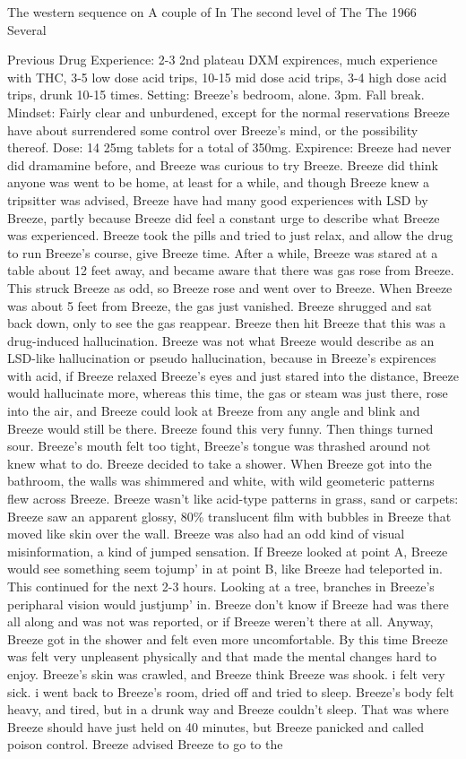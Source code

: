 \documentclass[12pt]{book}
\begin{document}
The western sequence on A couple of In The second level of The The 1966 Several



Previous Drug Experience: 2-3 2nd plateau DXM expirences, much experience with THC, 3-5 low dose acid trips, 10-15 mid dose acid trips, 3-4 high dose acid trips, drunk 10-15 times. Setting: Breeze's bedroom, alone. 3pm. Fall break. Mindset: Fairly clear and unburdened, except for the normal reservations Breeze have about surrendered some control over Breeze's mind, or the possibility thereof. Dose: 14 25mg tablets for a total of 350mg. Expirence: Breeze had never did dramamine before, and Breeze was curious to try Breeze. Breeze did think anyone was went to be home, at least for a while, and though Breeze knew a tripsitter was advised, Breeze have had many good experiences with LSD by Breeze, partly because Breeze did feel a constant urge to describe what Breeze was experienced. Breeze took the pills and tried to just relax, and allow the drug to run Breeze's course, give Breeze time. After a while, Breeze was stared at a table about 12 feet away, and became aware that there was gas rose from Breeze. This struck Breeze as odd, so Breeze rose and went over to Breeze. When Breeze was about 5 feet from Breeze, the gas just vanished. Breeze shrugged and sat back down, only to see the gas reappear. Breeze then hit Breeze that this was a drug-induced hallucination. Breeze was not what Breeze would describe as an LSD-like hallucination or pseudo hallucination, because in Breeze's expirences with acid, if Breeze relaxed Breeze's eyes and just stared into the distance, Breeze would hallucinate more, whereas this time, the gas or steam was just there, rose into the air, and Breeze could look at Breeze from any angle and blink and Breeze would still be there. Breeze found this very funny. Then things turned sour. Breeze's mouth felt too tight, Breeze's tongue was thrashed around not knew what to do. Breeze decided to take a shower. When Breeze got into the bathroom, the walls was shimmered and white, with wild geometeric patterns flew across Breeze. Breeze wasn't like acid-type patterns in grass, sand or carpets: Breeze saw an apparent glossy, 80\% translucent film with bubbles in Breeze that moved like skin over the wall. Breeze was also had an odd kind of visual misinformation, a kind of jumped sensation. If Breeze looked at point A, Breeze would see something seem tojump' in at point B, like Breeze had teleported in. This continued for the next 2-3 hours. Looking at a tree, branches in Breeze's peripharal vision would justjump' in. Breeze don't know if Breeze had was there all along and was not was reported, or if Breeze weren't there at all. Anyway, Breeze got in the shower and felt even more uncomfortable. By this time Breeze was felt very unpleasent physically and that made the mental changes hard to enjoy. Breeze's skin was crawled, and Breeze think Breeze was shook. i felt very sick. i went back to Breeze's room, dried off and tried to sleep. Breeze's body felt heavy, and tired, but in a drunk way and Breeze couldn't sleep. That was where Breeze should have just held on 40 minutes, but Breeze panicked and called poison control. Breeze advised Breeze to go to the 
\end{document}
